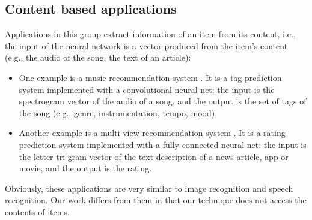 \documentclass[twocolumn]{article}
\begin{document}
\subsection{Content based applications}
Applications in this group extract information of an item from its content, 
i.e., the input of the neural network is a vector produced from the item's 
content (e.g., the audio of the song, the text of an article):
\begin{itemize}
	\item One example is a music recommendation system \cite{van2013deep}. 
	It is a tag prediction system implemented with a convolutional neural net: 
	the input is the spectrogram vector of the audio of a song, and the output 
	is the set of tags of the song (e.g., genre, instrumentation, tempo, mood).
	\item Another example is a multi-view recommendation system 
	\cite{elkahky2015multi}. 
	It is a rating prediction system implemented with a fully connected neural 
	net: the input is the letter tri-gram vector of the text description of a 
	news article, app or movie, and the output is the rating.
\end{itemize}
Obviously, these applications are very similar to image recognition and speech 
recognition.
Our work differs from them in that our technique does not access the contents 
of items.
\end{document}
